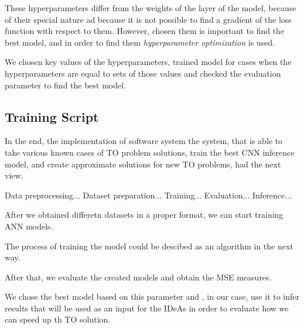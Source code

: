 These hyperparameters differ from the weights of the layer of the model, because of their special nature ad because it is not possible to find a gradient of the loss function with respect to them.
However, chosen them is important to find the best model, and in order to find them \textit{hyperparameter optimization} is used.
\medskip

We chosen key values of the hyperparameters, trained model for cases when the hyperparameters are equal to sets of those values and checked the evaluation parameter to find the best model.


\subsection{Training Script}

In the end, the implementation of software system the system, that is able to take various known cases of TO problem solutions, train the best CNN inference model, and create approximate solutions for new TO problems, had the next view.

Data preprocessing...
Dataset preparation...
Training...
Evaluation...
Inference...

After we obtained differetn datasets in a proper format, we can start training ANN models.

The process of training the model could be descibed as an algorithm in the next way.


After that, we evaluate the created models and obtain the MSE measures.

We chose the best model based on this parameter and , in our case, use it to infer results that will be used as an input for the IDeAs in order to evaluate how we can speed up th TO solution. 
